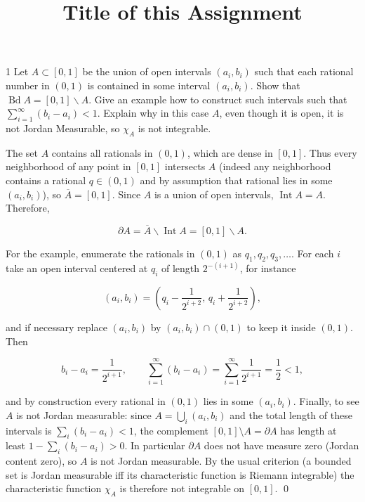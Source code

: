 \documentclass{myhw}
\title{Title of this Assignment}
\begin{document}
\maketitle

\begin{exercise}{1}
    Let $A \subset [0,1]$ be the union of open intervals $(a_i,b_i)$ such that each rational number in $(0,1)$ is contained in some interval $(a_i,b_i)$. Show that $\operatorname{Bd} A = [0,1] \smallsetminus A$. Give an example how to construct such intervals such that $\sum_{i=1}^{\infty} (b_i - a_i) < 1$. Explain why in this case $A$, even though it is open, it is not Jordan Measurable, so $\chi_A$ is not integrable.
\end{exercise}

\begin{solution}
    The set $A$ contains all rationals in $(0,1)$, which are dense in $[0,1]$. Thus every neighborhood of any point in $[0,1]$ intersects $A$ (indeed any neighborhood contains a rational $q\in(0,1)$ and by assumption that rational lies in some $(a_i,b_i)$), so $\overline{A} = [0,1]$. Since $A$ is a union of open intervals, $\operatorname{Int}A = A$. Therefore,
    
    \[ \partial A = \overline{A} \smallsetminus \operatorname{Int}A = [0,1] \smallsetminus A. \]
    
    For the example, enumerate the rationals in $(0,1)$ as $q_1,q_2,q_3,\ldots$. For each $i$ take an open interval centered at $q_i$ of length $2^{-(i+1)}$, for instance

    \[ (a_i,b_i)=\left(q_i-\frac{1}{2^{i+2}},\,q_i+\frac{1}{2^{i+2}}\right), \]

    and if necessary replace $(a_i,b_i)$ by $(a_i,b_i)\cap(0,1)$ to keep it inside $(0,1)$. Then

    \[ b_i-a_i=\frac{1}{2^{i+1}}, \qquad \sum_{i=1}^\infty (b_i-a_i)=\sum_{i=1}^\infty \frac{1}{2^{i+1}}=\frac12<1, \]

    and by construction every rational in $(0,1)$ lies in some $(a_i,b_i)$. Finally, to see $A$ is not Jordan measurable: since $A=\bigcup_i (a_i,b_i)$ and the total length of these intervals is $\sum_i (b_i-a_i)<1$, the complement $[0,1]\setminus A=\partial A$ has length at least $1-\sum_i(b_i-a_i)>0$. In particular $\partial A$ does not have measure zero (Jordan content zero), so $A$ is not Jordan measurable. By the usual criterion (a bounded set is Jordan measurable iff its characteristic function is Riemann integrable) the characteristic function $\chi_A$ is therefore not integrable on $[0,1]$. \qed
\end{solution}
\end{document}
